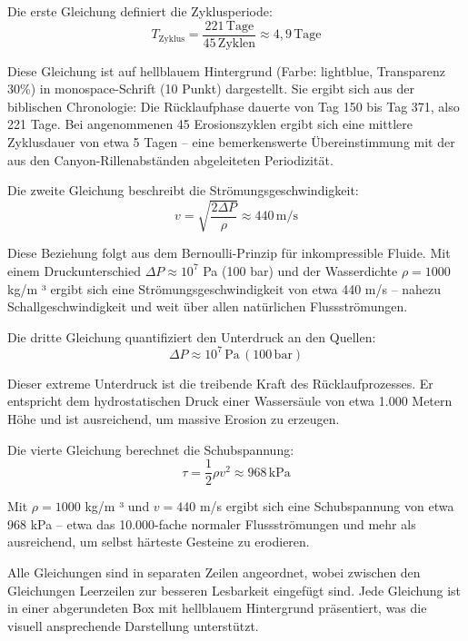 Die erste Gleichung definiert die Zyklusperiode:
\begin{equation*}
T_{\mathrm{Zyklus}} = \frac{221 \, \mathrm{Tage}}{45 \, \mathrm{Zyklen}} \approx 4{,}9 \, \mathrm{Tage}
\end{equation*}

Diese Gleichung ist auf hellblauem Hintergrund (Farbe: lightblue, Transparenz 30\%) in monospace-Schrift (10 Punkt) dargestellt. Sie ergibt sich aus der biblischen Chronologie: Die Rücklaufphase dauerte von Tag 150 bis Tag 371, also 221 Tage. Bei angenommenen 45 Erosionszyklen ergibt sich eine mittlere Zyklusdauer von etwa 5 Tagen -- eine bemerkenswerte Übereinstimmung mit der aus den Canyon-Rillenabständen abgeleiteten Periodizität.

Die zweite Gleichung beschreibt die Strömungsgeschwindigkeit:
\begin{equation*}
v = \sqrt{\frac{2 \Delta P}{\rho}} \approx 440 \, \mathrm{m/s}
\end{equation*}

Diese Beziehung folgt aus dem Bernoulli-Prinzip für inkompressible Fluide. Mit einem Druckunterschied $\Delta P \approx 10^7$ Pa (100 bar) und der Wasserdichte $\rho = 1000$ kg/m ³ ergibt sich eine Strömungsgeschwindigkeit von etwa 440 m/s -- nahezu Schallgeschwindigkeit und weit über allen natürlichen Flussströmungen.

Die dritte Gleichung quantifiziert den Unterdruck an den Quellen:
\begin{equation*}
\Delta P \approx 10^7 \, \mathrm{Pa} \, (100 \, \mathrm{bar})
\end{equation*}

Dieser extreme Unterdruck ist die treibende Kraft des Rücklaufprozesses. Er entspricht dem hydrostatischen Druck einer Wassersäule von etwa 1.000 Metern Höhe und ist ausreichend, um massive Erosion zu erzeugen.

Die vierte Gleichung berechnet die Schubspannung:
\begin{equation*}
\tau = \frac{1}{2} \rho v^2 \approx 968 \, \mathrm{kPa}
\end{equation*}

Mit $\rho = 1000$ kg/m ³ und $v = 440$ m/s ergibt sich eine Schubspannung von etwa 968 kPa -- etwa das 10.000-fache normaler Flussströmungen und mehr als ausreichend, um selbst härteste Gesteine zu erodieren.

Alle Gleichungen sind in separaten Zeilen angeordnet, wobei zwischen den Gleichungen Leerzeilen zur besseren Lesbarkeit eingefügt sind. Jede Gleichung ist in einer abgerundeten Box mit hellblauem Hintergrund präsentiert, was die visuell ansprechende Darstellung unterstützt.

